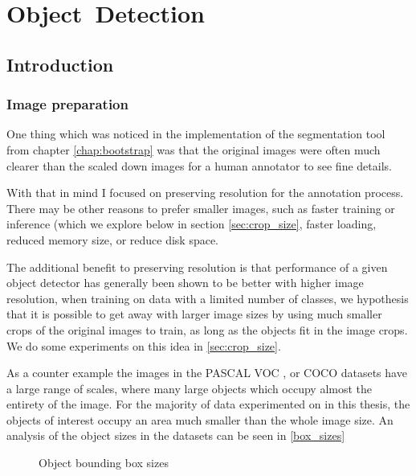 \chapter{Object~Detection}
\label{chap:object_detection} 


\section{Introduction}


\subsection {Image preparation}

One thing which was noticed in the implementation of the segmentation tool from chapter \ref{chap:bootstrap} was that the original images were often much clearer than the scaled down images for a human annotator to see fine details.

With that in mind I focused on preserving resolution for the annotation process. There may be other reasons to prefer smaller images, such as faster training or inference (which we explore below in section \ref{sec:crop_size}, faster loading, reduced memory size, or reduce disk space. 

The additional benefit to preserving resolution is that performance of a given object detector has generally been shown to be better with higher image resolution, when training on data with a limited number of classes, we hypothesis that it is possible to get away with larger image sizes by using much smaller crops of the original images to train, as long as the objects fit in the image crops. We do some experiments on this idea in \ref{sec:crop_size}.

As a counter example the images in the PASCAL VOC \cite{Everingham2008}, or COCO\cite{Lin2014} datasets have a large range of scales, where many large objects which occupy almost the entirety of the image. For the majority of data experimented on in this thesis, the objects of interest occupy an area much smaller than the whole image size. An analysis of the object sizes in the datasets can be seen in \ref {box_sizes}



\begin{figure}[ht]
\centering

\caption{Object bounding box sizes}
\label{fig:box_sizes}
\end{figure}



